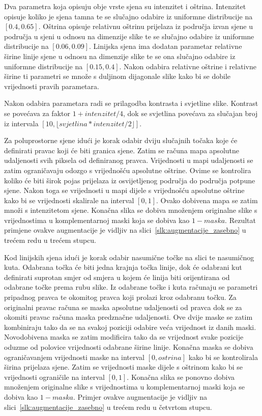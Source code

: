 \documentclass[diplomskirad]{fer}
\begin{document}
			Dva parametra koja opisuju obje vrste sjena su intenzitet i oštrina. Intenzitet opisuje koliko je sjena tamna te se slučajno odabire iz uniformne distribucije na $[0.4, 0.65]$. Oštrina opisuje relativnu oštrinu prijelaza iz područja izvan sjene u područja u sjeni u odnosu na dimenzije slike te se slučajno odabire iz uniformne distribucije na $[0.06, 0.09]$. Linijska sjena ima dodatan parametar relativne širine linije sjene u odnosu na dimenzije slike te se ona slučajno odabire iz uniformne distribucije na $[0.15, 0.4]$. Nakon odabira relativne oštrine i relativne širine ti parametri se množe s duljinom dijagonale slike kako bi se dobile vrijednosti pravih parametara.
			
			Nakon odabira parametara radi se prilagodba kontrasta i svjetline slike. Kontrast se povećava za faktor $1+intenzitet/4$, dok se svjetlina povećava za slučajan broj iz intervala $[10, \lfloor svjetlina*intenzitet/2 \rfloor]$.
			
			Za poluprostorne sjene idući je korak odabir dviju slučajnih točaka koje će definirati pravac koji će biti granica sjene. Zatim se računa mapa apsolutne udaljenosti svih piksela od definiranog pravca. Vrijednosti u mapi udaljenosti se zatim ograničavaju odozgo s vrijednošću apsolutne oštrine. Ovime se kontrolira koliko će biti širok pojas prijelaza iz osvijetljenog područja do područja potpune sjene. Nakon toga se vrijednosti u mapi dijele s vrijednošću apsolutne oštrine kako bi se vrijednosti skalirale na interval $[0, 1]$. Ovako dobivena mapa se zatim množi s intenzitetom sjene. Konačna slika se dobiva množenjem originalne slike s vrijednostima u komplementarnoj maski koja se dobiva kao $1-maska$. Rezultat primjene ovakve augmentacije je vidljiv na slici~\ref{slk:augmentacije_zasebno} u trećem redu u trećem stupcu.
			
			Kod linijskih sjena idući je korak odabir nasumične točke na slici te nasumičnog kuta. Odabrana točka će biti jedna krajnja točka linije, dok će odabrani kut definirati suprotan smjer od smjera u kojem će linija biti orijentirana od odabrane točke prema rubu slike. Iz odabrane točke i kuta računaju se parametri pripadnog pravca te okomitog pravca koji prolazi kroz odabranu točku. Za originalni pravac računa se maska apsolutne udaljenosti od pravca dok se za okomiti pravac računa maska predznačne udaljenosti. Ove dvije maske se zatim kombiniraju tako da se na svakoj poziciji odabire veća vrijednost iz danih maski. Novodobivena maska se zatim modificira tako da se vrijednost svake pozicije oduzme od polovice vrijednosti odabrane širine linije. Konačna maska se dobiva ograničavanjem vrijednosti maske na interval $[0, ostrina]$ kako bi se kontrolirala širina prijelaza sjene. Zatim se vrijednosti maske dijele s oštrinom kako bi se vrijednosti ograničile na interval $[0, 1]$. Konačna slika se ponovno dobiva množenjem originalne slike s vrijednostima u komplementarnoj maski koja se dobiva kao $1-maska$. Primjer ovakve augmentacije je vidljiv na slici~\ref{slk:augmentacije_zasebno} u trećem redu u četvrtom stupcu.
			
\end{document}
